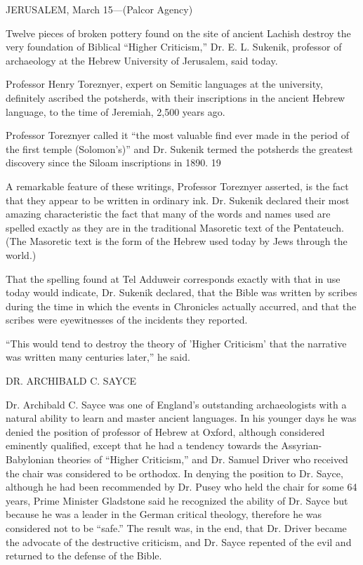 JERUSALEM, March 15—(Palcor Agency)

Twelve pieces of broken pottery found on the site of ancient Lachish destroy the very
foundation of Biblical ``Higher Criticism,'' Dr. E. L. Sukenik, professor of archaeology at the
Hebrew University of Jerusalem, said today.

Professor Henry Toreznyer, expert on Semitic languages at the university, definitely ascribed
the potsherds, with their inscriptions in the ancient Hebrew language, to the time of Jeremiah,
2,500 years ago.

Professor Toreznyer called it ``the most valuable find ever made in the period of the first
temple (Solomon's)'' and Dr. Sukenik termed the potsherds the greatest discovery since the
Siloam inscriptions in 1890. 19

A remarkable feature of these writings, Professor Toreznyer asserted, is the fact that they
appear to be written in ordinary ink. Dr. Sukenik declared their most amazing characteristic
the fact that many of the words and names used are spelled exactly as they are in the
traditional Masoretic text of the Pentateuch. (The Masoretic text is the form of the Hebrew
used today by Jews through the world.)

That the spelling found at Tel Adduweir corresponds exactly with that in use today would
indicate, Dr. Sukenik declared, that the Bible was written by scribes during the time in which
the events in Chronicles actually accurred, and that the scribes were eyewitnesses of the
incidents they reported.

``This would tend to destroy the theory of 'Higher Criticism' that the narrative was written
many centuries later,'' he said.

DR. ARCHIBALD C. SAYCE

Dr. Archibald C. Sayce was one of England's outstanding archaeologists with a natural
ability to learn and master ancient languages. In his younger days he was denied the position
of professor of Hebrew at Oxford, although considered eminently qualified, except that he
had a tendency towards the Assyrian-Babylonian theories of ``Higher Criticism,'' and Dr.
Samuel Driver who received the chair was considered to be orthodox. In denying the position
to Dr. Sayce, although he had been recommended by Dr. Pusey who held the chair for some
64 years, Prime Minister Gladstone said he recognized the ability of Dr. Sayce but because
he was a leader in the German critical theology, therefore he was considered not to be ``safe.''
The result was, in the end, that Dr. Driver became the advocate of the destructive criticism,
and Dr. Sayce repented of the evil and returned to the defense of the Bible.


